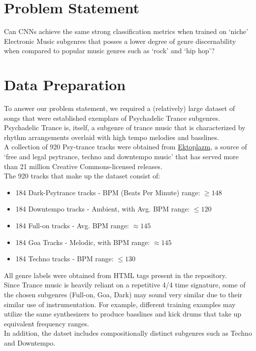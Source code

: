 \documentclass[12pt]{article}
\newcounter{ct}
\begin{document}
\section*{Problem Statement}
Can CNNs achieve the same strong classification metrics when trained
on `niche' Electronic Music subgenres that posses a lower degree 
of genre discernability when compared to popular music genres
such as `rock' and `hip hop'?

\section*{Data Preparation}
To answer our problem statement, we required a (relatively) large dataset of 
songs that were established exemplars of 
Psychadelic Trance subgenres.\\
Psychadelic Trance is, itself, a subgenre of trance music that is characterized
by rhythm arrangements overlaid with high tempo melodies 
and basslines. \\
A collection of 920 Psy-trance tracks were obtained from 
\href{http://www.ektoplazm.com/}{Ektoplazm}, a  
source of `free and legal psytrance, techno and downtempo music' that
has served more than 21 million Creative Commons-licensed releases.\\
The 920 tracks that make up the dataset consist of:
\begin{itemize}
    \item 184 Dark-Psytrance tracks - 
    BPM (Beats Per Minute) range: $\ge 148$
    \item 184 Downtempo tracks  - Ambient, with Avg. BPM range: $\le 120$
    \item 184 Full-on tracks -  Avg. BPM range: $\approx 145$
    \item 184 Goa Tracks - Melodic, with BPM range: $\approx 145$
    \item 184 Techno tracks - BPM range: $\le 130$
\end{itemize}
All genre labels were obtained from HTML tags present in the repository.\\
Since Trance music is heavily reliant on a repetitive 4/4 time signature, 
some of the chosen subgenres (Full-on, Goa, Dark) may sound very similar 
due to their similar use of instrumentation. For example, 
different training examples may utilize the same synthesizers
to produce basslines and kick drums 
that take up equivalent frequency ranges.\\
In addition, the datset includes compositionally distinct subgenres such 
as Techno and Downtempo.
\end{document}
